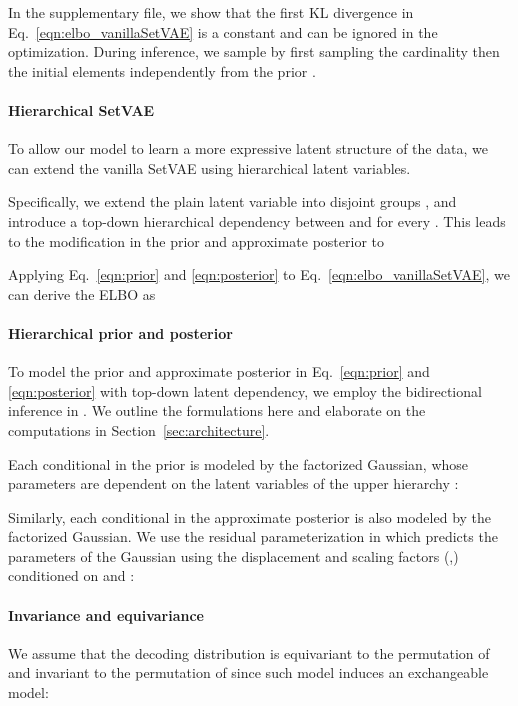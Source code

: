 \documentclass[final]{arxiv/cvpr}
\newcommand{\cutparagraphup}{\vspace*{-0.1in}}
\begin{document}
In the supplementary file, we show that the first KL divergence in Eq.~\eqref{eqn:elbo_vanillaSetVAE} is a constant and can be ignored in the optimization.
During inference, we sample  by first sampling the cardinality  then the  initial elements independently from the prior .

\cutparagraphup
\paragraph{Hierarchical SetVAE}
To allow our model to learn a more expressive latent structure of the data, we can extend the vanilla SetVAE using hierarchical latent variables.

Specifically, we extend the plain latent variable  into  disjoint groups , and introduce a top-down hierarchical dependency between  and  for every . 
This leads to the modification in the prior and approximate posterior to


Applying Eq.~\eqref{eqn:prior} and \eqref{eqn:posterior} to Eq.~\eqref{eqn:elbo_vanillaSetVAE}, we can derive the ELBO as


\cutparagraphup
\paragraph{Hierarchical prior and posterior}
To model the prior and approximate posterior in Eq.~\eqref{eqn:prior} and \eqref{eqn:posterior} with top-down latent dependency, we employ the bidirectional inference in \cite{sonderby2016ladder}.
We outline the formulations here and elaborate on the computations in Section~\ref{sec:architecture}. 

Each conditional  in the prior is modeled by the factorized Gaussian, whose parameters are dependent on the latent variables of the upper hierarchy :


Similarly, each conditional in the approximate posterior  is also modeled by the factorized Gaussian.
We use the residual parameterization in \cite{vahdat2020nvae} which predicts the parameters of the Gaussian using the displacement and scaling factors (,) conditioned on  and :


\cutparagraphup
\paragraph{Invariance and equivariance}
We assume that the decoding distribution   is equivariant to the permutation of  and invariant to the permutation of  since such model induces an exchangeable model:
\end{document}
